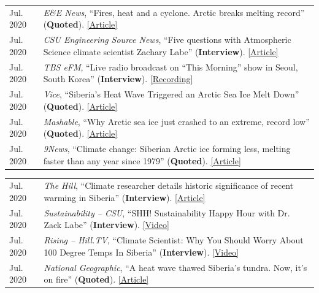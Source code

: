 \documentclass[margin,line,palatino,courier,10pt]{res}
\begin{document}
\begin{resume}
\begin{tabular}{@{}p{0.9in}p{4in}}
Jul. 2020 & \textit{E\&E News}, ``Fires, heat and a cyclone. Arctic breaks melting record'' (\textbf{Quoted}). \href{https://www.eenews.net/stories/1063658765}{[Article]}\\
Jul. 2020 & \textit{CSU Engineering Source News}, ``Five questions with Atmospheric Science climate scientist Zachary Labe'' (\textbf{Interview}). \href{https://engr.source.colostate.edu/five-questions-with-climate-scientist-zachary-labe/}{[Article]}\\
Jul. 2020 & \textit{TBS eFM}, ``Live radio broadcast on “This Morning” show in Seoul, South Korea'' (\textbf{Interview}). \href{https://podcasts.apple.com/kr/podcast/0724-in-focus-1-effects-human-induced-climate-change/id1038822609?i=1000485914634&l=en}{[Recording]}\\
Jul. 2020 & \textit{Vice}, ``Siberia's Heat Wave Triggered an Arctic Sea Ice Melt Down'' (\textbf{Quoted}). \href{https://www.vice.com/en_us/article/ep45be/siberias-heat-wave-triggered-an-arctic-sea-ice-melt-down}{[Article]}\\
Jul. 2020 & \textit{Mashable}, ``Why Arctic sea ice just crashed to an extreme, record low'' (\textbf{Quoted}). \href{https://mashable.com/article/arctic-sea-ice-plummets-2020/}{[Article]}\\
Jul. 2020 & \textit{9News}, ``Climate change: Siberian Arctic ice forming less, melting faster than any year since 1979'' (\textbf{Quoted}). \href{https://www.9news.com.au/world/climate-change-global-warming-siberian-heatwave-arctic-ice-melting-faster-us-research-data/}{[Article]}\\
\end{tabular}
\begin{tabular}{@{}p{0.9in}p{4in}}
Jul. 2020 & \textit{The Hill}, ``Climate researcher details historic significance of recent warming in Siberia'' (\textbf{Interview}). \href{https://thehill.com/hilltv/rising/507850-climate-researcher-details-historic-significance-of-recent-warming-in-siberia}{[Article]}\\
Jul. 2020 & \textit{Sustainability -- CSU}, ``SHH! Sustainability Happy Hour with Dr. Zack Labe'' (\textbf{Interview}). \href{https://www.youtube.com/watch?v=E6htTPoeXQ8&feature=youtu.be}{[Video]}\\
Jul. 2020 & \textit{Rising -- Hill.TV}, ``Climate Scientist: Why You Should Worry About 100 Degree Temps In Siberia'' (\textbf{Interview}). \href{https://www.youtube.com/watch?v=fw4fG-_aI28&feature=youtu.be}{[Video]}\\
Jul. 2020 & \textit{National Geographic}, ``A heat wave thawed Siberia’s tundra. Now, it’s on fire'' (\textbf{Quoted}). \href{https://www.nationalgeographic.com/science/2020/07/heat-wave-thawed-siberia-now-on-fire/#close}{[Article]}\\

\end{tabular}
\end{resume}
\end{document}
